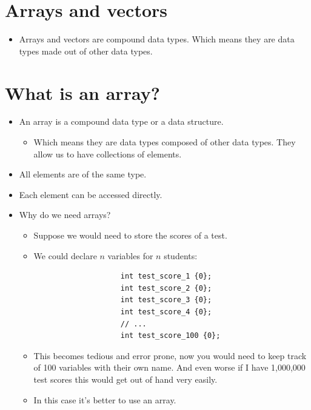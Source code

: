 \section{Arrays and vectors}
\begin{itemize}
    \item Arrays and vectors are compound data types. Which means they are data types made out of other data types.
\end{itemize}

\section{What is an array?}
\begin{itemize}
    \item An array is a compound data type or a data structure.
        \begin{itemize}
            \item Which means they are data types composed of other data types. They allow us to have collections of elements. 
        \end{itemize}
    \item All elements are of the same type.
    \item Each element can be accessed directly.
    \item Why do we need arrays?
        \begin{itemize}
            \item Suppose we would need to store the scores of a test. 
            \item We could declare $n$ variables for $n$ students:
                \begin{verbatim}
                    int test_score_1 {0};
                    int test_score_2 {0};
                    int test_score_3 {0};
                    int test_score_4 {0};
                    // ...
                    int test_score_100 {0};
                \end{verbatim}
            
            \item This becomes tedious and error prone, now you would need to keep track of 100 variables with their own name. And even worse if I have 1,000,000 test scores this would get out of hand very easily.
            \item In this case it's better to use an array.
        \end{itemize}
\end{itemize}

